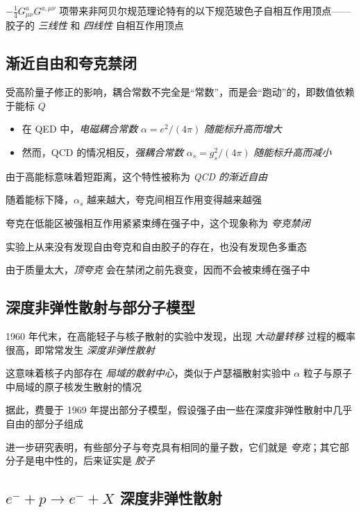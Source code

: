\documentclass[oneside,a4paper,openany,11pt]{ctexbook}
\begin{document}
$-\frac{1}{4} G^a_{\mu\nu} G^{a, \mu\nu}$ 项带来非阿贝尔规范理论特有的以下规范玻色子自相互作用顶点——胶子的 \emph{三线性} 和 \emph{四线性} 自相互作用顶点

\subsection{渐近自由和夸克禁闭}

受高阶量子修正的影响，耦合常数不完全是“常数”，而是会“跑动”的，即数值依赖于能标 $Q$

\begin{itemize}
    \item 在 QED 中，\emph{电磁耦合常数} $\alpha=e^2 / (4\pi)$ \emph{随能标升高而增大}
    \item 然而，QCD 的情况相反，\emph{强耦合常数} $\alpha_s = g^2_s / (4\pi)$ \emph{随能标升高而减小}
\end{itemize}

由于高能标意味着短距离，这个特性被称为 \emph{QCD 的渐近自由}

随着能标下降，$\alpha_s$ 越来越大，夸克间相互作用变得越来越强

夸克在低能区被强相互作用紧紧束缚在强子中，这个现象称为 \emph{夸克禁闭}

实验上从来没有发现自由夸克和自由胶子的存在，也没有发现色多重态

由于质量太大，\emph{顶夸克} 会在禁闭之前先衰变，因而不会被束缚在强子中

\subsection{深度非弹性散射与部分子模型}

1960 年代末，在高能轻子与核子散射的实验中发现，出现 \emph{大动量转移} 过程的概率很高，即常常发生 \emph{深度非弹性散射}

这意味着核子内部存在 \emph{局域的散射中心}，类似于卢瑟福散射实验中 $\alpha$ 粒子与原子中局域的原子核发生散射的情况

据此，费曼于 1969 年提出部分子模型，假设强子由一些在深度非弹性散射中几乎自由的部分子组成

进一步研究表明，有些部分子与夸克具有相同的量子数，它们就是 \emph{夸克}；其它部分子是电中性的，后来证实是 \emph{胶子}

\subsection{$e^- + p \to e^- + X$ 深度非弹性散射}
\end{document}
